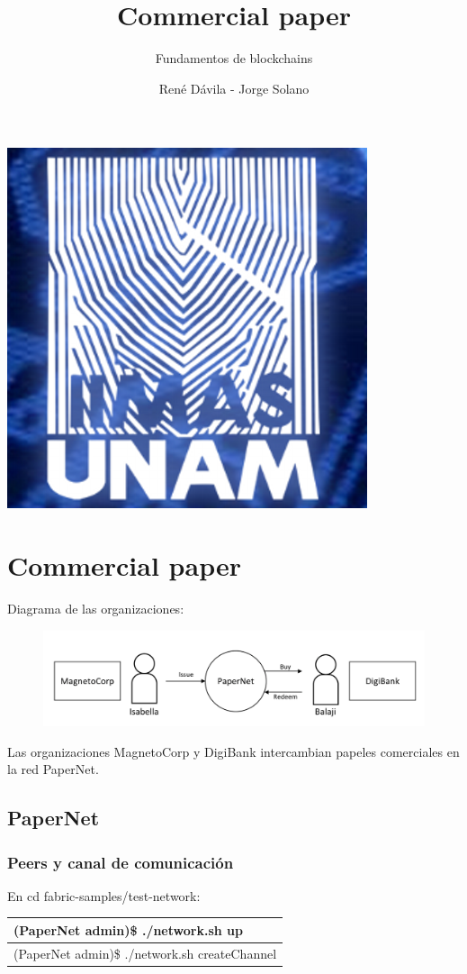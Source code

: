 \documentclass{beamer}
\title[]{Commercial paper}
\subtitle{Fundamentos de blockchains}
\author{René Dávila - Jorge Solano}
\date{ }
\begin{document}
	\EnableBpAbbreviations
	
	\begin{frame}
		\begin{center}
			\includegraphics [width =0.2 \textwidth ]{iimas}
		\end{center}
		\titlepage 
	\end{frame}

	\section{Commercial paper}
	
	\begin{frame}
		Diagrama de las organizaciones:
		\begin{figure}[h]
			\includegraphics[scale=.5]{papernet_01}
			\centering
		\end{figure}
		Las organizaciones MagnetoCorp y DigiBank intercambian papeles comerciales en la red PaperNet.
	\end{frame}
	
	\subsection{PaperNet}

	\begin{frame}
		\frametitle{Peers y canal de comunicación}
		En cd fabric-samples/test-network:\\
		\begin{center}
			\begin{tabulary}{\linewidth}{L}
				\hline
				(PaperNet admin)\$ ./network.sh up \\
				\hline 
				(PaperNet admin)\$ ./network.sh createChannel \\
				\hline
			\end{tabulary} 
		\end{center}
	\end{frame}
	
\end{document}
